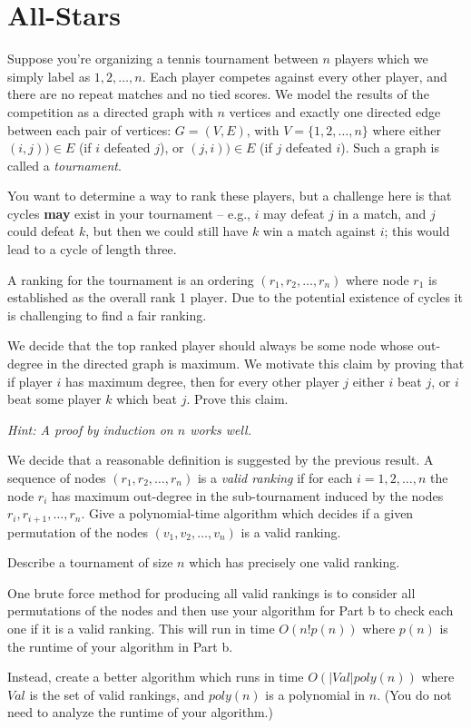 \section{All-Stars}

Suppose you're organizing a tennis tournament between $n$ players which we simply label as $1,2, \ldots ,n$. Each player competes against every other player, and there are no repeat matches and no tied scores. We model the results of the competition as a directed graph with $n$ vertices and exactly one directed edge between each pair of vertices: $G=(V,E)$, with $V =\{1,2, \ldots ,n\}$ where either $(i,j)) \in E$ (if $i$ defeated $j$), or $(j,i)) \in E$ (if $j$ defeated $i$). Such a graph is called a \emph{tournament}.

You want to determine a way to rank these players, but a challenge here is that cycles \textbf{may} exist in your tournament -- e.g., $i$ may defeat $j$ in a match, and $j$ could defeat $k$, but then we could still have $k$ win a match against $i$; this  would lead to a cycle of length three.

A ranking for the tournament is an ordering $(r_1,r_2, \ldots ,r_n)$ where node $r_1$ is established as the overall rank 1 player. Due to the potential existence of cycles it is challenging to find a fair ranking.


\begin{questions}
	\question[4]  We decide that the top ranked player should
	always be some node whose out-degree in the directed graph is maximum. We motivate this claim by proving that if player $i$ has maximum degree, then for every other player $j$ either $i$ beat $j$, or $i$ beat some player $k$ which beat $j$. Prove this claim.

		{\em Hint: A proof by induction on $n$ works well.}

	\ifsolutions\fi

	\question[2] We decide that a reasonable definition  is suggested by the previous result. A sequence of nodes $(r_1,r_2, \ldots ,r_n)$ is a \emph{valid ranking} if for each $i=1,2, \ldots ,n$ the node $r_i$ has maximum out-degree in the sub-tournament induced by the nodes $r_i,r_{i+1}, \ldots ,r_n$. Give a polynomial-time algorithm which decides if a given permutation of the nodes $(v_1,v_2, \ldots ,v_n)$ is a valid ranking.

	\ifsolutions\fi

	\question[2] Describe a tournament of size $n$ which has precisely one valid ranking.

	\ifsolutions\fi

	\question[4] One brute force method for
	producing all valid rankings is to consider all permutations of the nodes and then use your algorithm for Part b to check each one if it is a valid ranking. This will run in time $O(n! p(n))$ where $p(n)$ is the runtime of your algorithm in Part b.

	Instead, create a better algorithm which runs in time $O(|Val| poly(n))$ where $Val$ is the set of valid rankings, and $poly(n)$ is a polynomial in $n$. (You do not need to analyze the runtime of your algorithm.)

	\ifsolutions\fi
\end{questions}
